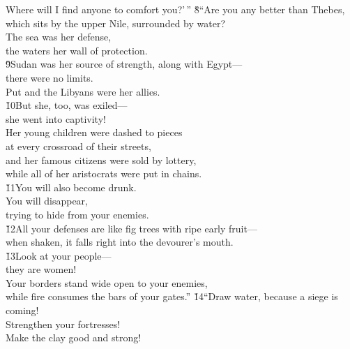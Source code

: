 \begin{poetry}
\poemll    Where will I find anyone to comfort you?'\,''
\poeml \v{8}``Are you any better than Thebes, \\
\poemll    which sits by the upper Nile, surrounded by water? \\
\poeml The sea was her defense, \\
\poemll    the waters her wall of protection. \\
\poeml \v{9}Sudan was her source of strength, along with Egypt--- \\
\poemll    there were no limits. \\
\poeml Put and the Libyans were her allies. \\
\poeml \v{10}But she, too, was exiled--- \\
\poemll    she went into captivity! \\
\poeml Her young children were dashed to pieces \\
\poemll    at every crossroad of their streets, \\
\poeml and her famous citizens were sold by lottery, \\
\poemll    while all of her aristocrats were put in chains. \\
\poeml \v{11}You will also become drunk. \\
\poemll    You will disappear, \\
\poemlll       trying to hide from your enemies. \\
\poeml \v{12}All your defenses are like fig trees with ripe early fruit--- \\
\poemll    when shaken, it falls right into the devourer's mouth. \\
\poeml \v{13}Look at your people--- \\
\poemll    they are women! \\
\poeml Your borders stand wide open to your enemies, \\
\poemll    while fire consumes the bars of your gates.''
\poeml \v{14}``Draw water, because a siege is coming! \\
\poemll    Strengthen your fortresses! \\
\poeml Make the clay good and strong! \\

\end{poetry}

